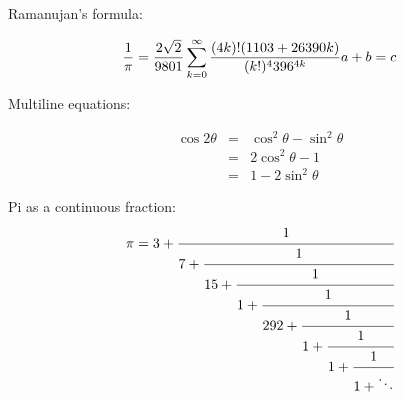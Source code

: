 \documentclass{article}
\begin{document}
Ramanujan's formula:

$$\frac{1}{\pi}=\frac{2\sqrt{2}}{9801}\sum_{k=0}^\infty\frac{(4k)! (1103+26390k)}{(k!)^4 396^{4k}} \\
a+b=c
$$

Multiline equations:

\begin{eqnarray*}
\cos{2\theta} & = & \cos^2\theta - \sin^2\theta \\
              & = & 2\cos^2\theta - 1 \\
              & = & 1 - 2\sin^2\theta
\end{eqnarray*}

Pi as a continuous fraction:
\begin{equation*}
\pi = 3+\textstyle \cfrac{1}{7+\textstyle \cfrac{1}{15+\textstyle \cfrac{1}{1+\textstyle \cfrac{1}{292+\textstyle \cfrac{1}{1+\textstyle \cfrac{1}{1+\textstyle \cfrac{1}{1+\ddots}}}}}}}
\end{equation*}
\end{document}
